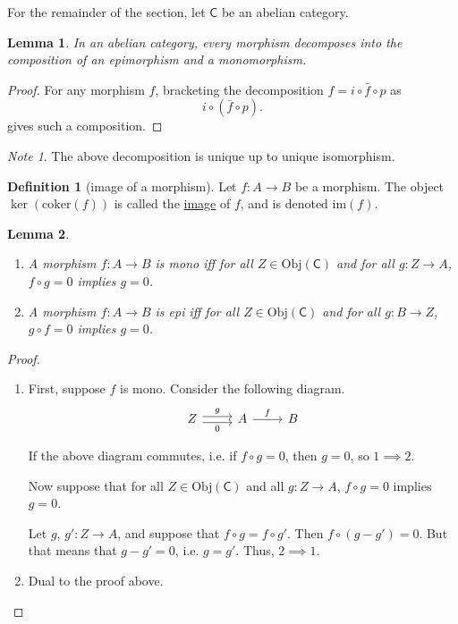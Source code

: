 \documentclass[a4paper,10pt]{scrreprt}
\newcommand{\defn}[1]{\ul{#1}}
\newcommand{\Obj}{\mathrm{Obj}}
\newcommand{\coker}{\mathrm{coker}}
\newcommand{\im}{\mathrm{im}}
\theoremstyle{definition}
\newtheorem{definition}{Definition}[section]
\theoremstyle{plain}
\newtheorem{lemma}{Lemma}[section]
\theoremstyle{remark}
\newtheorem{note}{Note}[section]
\begin{document}
For the remainder of the section, let $\mathsf{C}$ be an abelian category.

\begin{lemma}
  In an abelian category, every morphism decomposes into the composition of an epimorphism and a monomorphism.
\end{lemma}
\begin{proof}
  For any morphism $f$, bracketing the decomposition $f = i \circ \bar{f} \circ p$ as
  \begin{equation*}
    i \circ (\bar{f} \circ p).
  \end{equation*}
  gives such a composition.
\end{proof}

\begin{note}
  The above decomposition is unique up to unique isomorphism.
\end{note}

\begin{definition}[image of a morphism]
  \label{def:imageofamorphism}
  Let $f\colon A \to B$ be a morphism. The object $\ker(\coker(f))$ is called the \defn{image} of $f$, and is denoted $\im(f)$.
\end{definition}

\begin{lemma}
  \label{lemma:morphismwhichkillsontherightismono}
  $\,$
  \begin{enumerate}
    \item A morphism $f\colon A \to B$ is mono iff for all $Z \in \Obj(\mathsf{C})$ and for all $g\colon Z \to A$, $f \circ g = 0$ implies $g = 0$.
    \item A morphism $f\colon A \to B$ is epi iff for all $Z \in \Obj(\mathsf{C})$ and for all $g\colon B \to Z$, $g \circ f = 0$ implies $g = 0$.
  \end{enumerate}
\end{lemma}
\begin{proof}
  $\,$
  \begin{enumerate}
    \item First, suppose $f$ is mono. Consider the following diagram.
      \begin{equation*}
        \begin{tikzcd}
          Z
          \arrow[r, shift left, "g"]
          \arrow[r, swap, shift right, "0"]
          & A
          \arrow[r, "f"]
          & B
        \end{tikzcd}
      \end{equation*}

      If the above diagram commutes, i.e. if $f \circ g = 0$, then $g = 0$, so $1 \implies 2$.

      Now suppose that for all $Z \in \Obj(\mathsf{C})$ and all $g\colon Z \to A$, $f \circ g = 0$ implies $g = 0$.

      Let $g$, $g'\colon Z \to A$, and suppose that $f \circ g = f \circ g'$. Then $f \circ (g - g') = 0$. But that means that $g - g' = 0$, i.e. $g = g'$. Thus, $2 \implies 1$.

    \item Dual to the proof above.
  \end{enumerate}
\end{proof}
\end{document}
